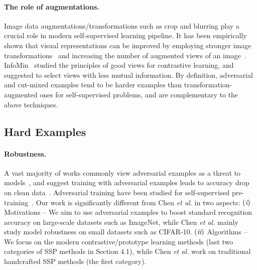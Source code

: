 \documentclass[10pt,twocolumn,letterpaper]{article}
\newcommand{\RN}[1]{\textup{\lowercase\expandafter{\it \romannumeral#1}}}
\newcommand{\ea}[0]{\emph{et al. }}
\begin{document}
\paragraph{The role of augmentations.} Image data augmentations/transformations such as crop and blurring play a crucial role in modern self-supervised learning pipeline. It has been empirically shown that visual representations can be improved by employing stronger image transformations~\cite{chen2020improved} and increasing the number of augmented views of an image~\cite{caron2020unsupervised}. InfoMin~\cite{tian2020makes} studied the principles of good views for contrastive learning, and suggested to select views with less mutual information. By definition, adversarial and cut-mixed examples tend to be harder examples than transformation-augmented ones for self-supervised problems, and are complementary to the above techniques.

\subsection{Hard Examples}
\paragraph{Robustness.} A vast majority of works commonly view adversarial examples as a threat to models~\cite{goodfellow2014explaining,madry2017towards}, and suggest training with adversarial examples leads to accuracy drop on clean data~\cite{raghunathan2019adversarial,min2020curious}.
Adversarial training have been studied for self-supervised pre-training~\cite{chen2020adversarial}. Our work is significantly different from Chen \ea\cite{chen2020adversarial} in two aspects: 
$(\RN{1})$ Motivations -- We aim to use adversarial examples to boost standard recognition accuracy on large-scale datasets such as ImageNet, while Chen \ea\cite{chen2020adversarial} mainly study model robustness on small datasets such as CIFAR-10.
$(\RN{2})$ Algorithms -- We focus on the modern contrastive/prototype learning methods (last two categories of SSP methods in Section 4.1), while Chen \ea\cite{chen2020adversarial} work on traditional handcrafted SSP methods (the first category). 
\end{document}
